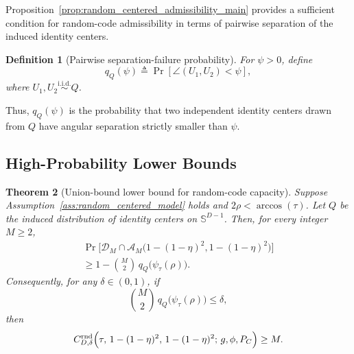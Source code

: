 \documentclass[journal]{IEEEtran}
\newtheorem{theorem}{Theorem}
\newtheorem{definition}[theorem]{Definition}
\begin{document}
\begin{bibunit}
Proposition~\ref{prop:random_centered_admissibility_main} provides a sufficient condition for random-code admissibility in terms of pairwise separation of the induced identity centers.

\begin{definition}[Pairwise separation-failure probability]
\label{def:center_collision_probability}
%
For $\psi>0$, define
%
\begin{equation}
q_Q(\psi) \triangleq \Pr \left[\angle(U_1,U_2)<\psi\right],
\label{eq:center_collision_probability}
\end{equation}
%
where $U_1,U_2\stackrel{\mathrm{i.i.d.}}{\sim}Q$.
%
\end{definition}

Thus, $q_Q(\psi)$ is the probability that two independent identity centers drawn from $Q$ have angular separation strictly smaller than $\psi$.









\subsection{High-Probability Lower Bounds}

\begin{theorem}[Union-bound lower bound for random-code capacity]
\label{thm:random_capacity_union_bound_main}
%
Suppose Assumption~\ref{ass:random_centered_model} holds and $2\rho<\arccos(\tau)$. Let $Q$ be the induced distribution of identity centers on $\mathbb S^{D-1}$. Then, for every integer $M\ge2$,
%
\begin{multline}
\Pr\bigl[ \mathcal D_M\cap \mathcal A_M\bigl(1-(1-\eta)^2,1-(1-\eta)^2\bigr) \bigr] \\
\ge 1-\binom{M}{2}\, q_Q\bigl(\psi_\tau(\rho)\bigr).
\label{eq:union_bound_admissibility_main}
\end{multline}
%
Consequently, for any $\delta\in(0,1)$, if
%
\begin{equation}
\binom{M}{2}\, q_Q\bigl(\psi_\tau(\rho)\bigr) \le\delta,
\label{eq:union_bound_capacity_condition_main}
\end{equation}
%
then
%
\begin{equation}
C_{D,\delta}^{\mathrm{rnd}} \Bigl(
\tau,\, 1-(1-\eta)^2,\, 1-(1-\eta)^2;\, g,\phi,P_C \Bigr) \ge M.
\label{eq:random_capacity_lower_bound_main}
\end{equation}
%
\end{theorem}


\end{bibunit}
\end{document}
